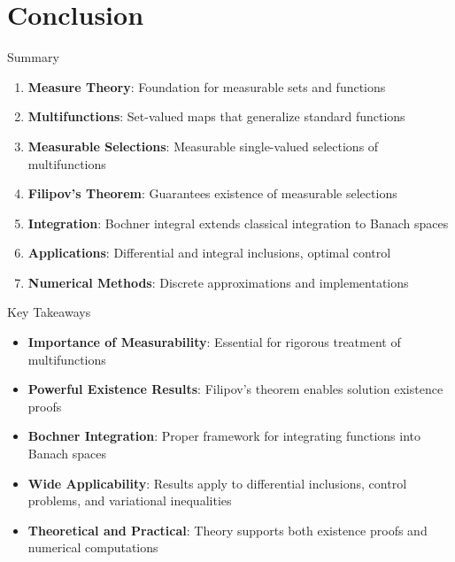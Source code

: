 \documentclass[aspectratio=169,10pt]{beamer}
\begin{document}
\section{Conclusion}

\begin{frame}{Summary}
\begin{enumerate}
    \item \textbf{Measure Theory}: Foundation for measurable sets and functions

    \item \textbf{Multifunctions}: Set-valued maps that generalize standard functions

    \item \textbf{Measurable Selections}: Measurable single-valued selections of multifunctions

    \item \textbf{Filipov's Theorem}: Guarantees existence of measurable selections

    \item \textbf{Integration}: Bochner integral extends classical integration to Banach spaces

    \item \textbf{Applications}: Differential and integral inclusions, optimal control

    \item \textbf{Numerical Methods}: Discrete approximations and implementations
\end{enumerate}
\end{frame}

\begin{frame}{Key Takeaways}
\begin{itemize}
    \item \textbf{Importance of Measurability}: Essential for rigorous treatment of multifunctions

    \item \textbf{Powerful Existence Results}: Filipov's theorem enables solution existence proofs

    \item \textbf{Bochner Integration}: Proper framework for integrating functions into Banach spaces

    \item \textbf{Wide Applicability}: Results apply to differential inclusions, control problems, and variational inequalities

    \item \textbf{Theoretical and Practical}: Theory supports both existence proofs and numerical computations
\end{itemize}
\end{frame}
\end{document}

